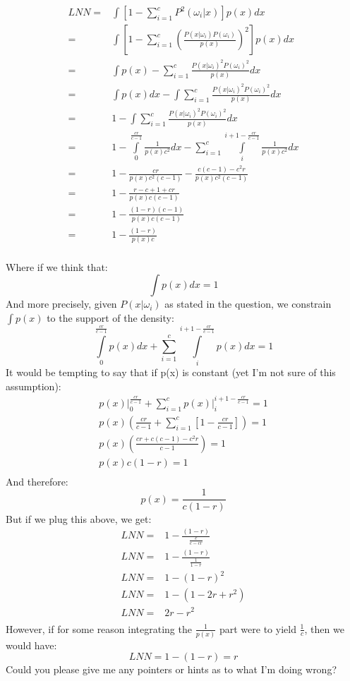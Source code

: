 \documentclass{article}
\begin{document}
\[
	\begin{aligned}
		LNN =& \int\left[ 1 - \sum_{i=1}^{c}P^2(\omega_i | x)\right]p(x)dx \\
		       =& \int\left[ 1 - \sum_{i=1}^{c}
		       		\left(\frac{P(x | \omega_i )P(\omega_i)}{p(x)}\right)^2
		       	\right]p(x)dx \\	
		       =& \int p(x) - \sum_{i=1}^{c}
		       		\frac{P(x | \omega_i )^2P(\omega_i)^2}{p(x)}dx \\ %
		       =& \int p(x)dx - 
		     	 \int\sum_{i=1}^{c} \frac{P(x | \omega_i )^2P(\omega_i)^2}{p(x)}dx \\ 
		      =& 1 -  \int\sum_{i=1}^{c}\frac{P(x | \omega_i )^2P(\omega_i)^2}{p(x)}dx \\ 
		      =& 1 -  \int\limits_0^{\frac{cr}{c-1}}\frac{1}{p(x)c^2}dx 
		      	  - \sum_{i=1}^{c}\int\limits_i^{i+1-\frac{cr}{c-1}}\frac{1}{p(x)c^2}dx \\ 
		      =& 1 - \frac{cr}{p(x)c^2(c-1)} - \frac{c(c-1) - c^2r}{p(x)c^2(c-1)}\\
		      =& 1 - \frac{r- c+1 + cr}{p(x)c(c-1)}\\
		      =& 1 - \frac{(1 - r) (c-1)}{p(x)c(c-1)}\\
		      =& 1 - \frac{(1 - r)}{p(x)c}\\		      
	\end{aligned}
\]

Where if we think that:
\[ \int p(x)dx  = 1 \]
And more precisely, given $P(x | \omega_i)$ as stated in the question, we constrain $\int p(x)$ to the support of the density:
\[ \int\limits_0^{\frac{cr}{c-1}} p(x)dx + \sum_{i=1}^{c}\int\limits_i^{i+1-\frac{cr}{c-1}} p(x)dx  = 1 \] \clearpage
It would be tempting to say that if p(x) is constant (yet I'm not sure of this assumption):
\[
	\begin{aligned}
		p(x) \bigg|_{0}^{\frac{cr}{c-1}} +  \sum\limits_{i=1}^{c} p(x) \bigg|_{i}^{i+1-\frac{cr}{c-1}} = 1 \\
		p(x)\left(\frac{cr}{c-1} + \sum_{i=1}^{c}\left[1 - \frac{cr}{c-1}\right] \right) = 1\\
		p(x)\left(\frac{cr+c(c-1)-c^2r}{c-1}\right) = 1\\
		p(x)c(1-r) = 1\\
	\end{aligned}		
\]
And therefore:
\[ p(x) = \frac{1}{c(1-r)}\]
But if we plug this above, we get:
\[ 
	\begin{aligned}
		LNN =& 1 - \frac{(1 - r)}{\frac{c}{c-cr}}\\
		LNN =& 1 - \frac{(1 - r)}{\frac{1}{1-r}}\\
		LNN =& 1 - (1 - r)^2\\
		LNN =& 1 - (1 - 2r + r^2)\\
		LNN =& 2r - r^2\\
	\end{aligned}
\]
However, if for some reason integrating the $\frac{1}{p(x)}$ part were to yield $\frac{1}{c}$, then we would have:
\[ LNN = 1 - (1 - r) = r\]
Could you please give me any pointers or hints as to what I'm doing wrong?
\end{document}
